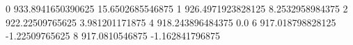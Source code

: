 0 933.8941650390625 15.6502685546875
1 926.4971923828125 8.2532958984375
2 922.22509765625 3.981201171875
4 918.243896484375 0.0
6 917.018798828125 -1.22509765625
8 917.0810546875 -1.162841796875
